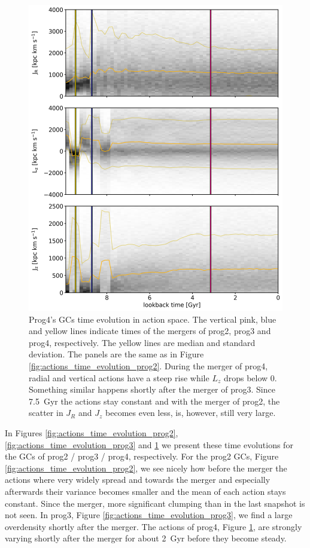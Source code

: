 \begin{figure}[htbp]
\captionsetup{format=plain}
    \centering
	\includegraphics[width=\textwidth]{plots/Dynamics/prog4/action_time_evolution_wodisk_hist_mean.png}
    \caption{Prog4's \acp{GC} time evolution in action space. The vertical pink, blue and yellow lines indicate times of the mergers of prog2, prog3 and prog4, respectively. The yellow lines are median and standard deviation. The panels are the same as in Figure \ref{fig:actions_time_evolution_prog2}. During the merger of prog4, radial and vertical actions have a steep rise while $L_z$ drops below 0. Something similar happens shortly after the merger of prog3. Since \SI{7.5}{Gyr} the actions stay constant and with the merger of prog2, the scatter in $J_R$ and $J_z$ becomes even less, is, however, still very large.}\label{fig:actions_time_evolution_prog4}
\end{figure}
In Figures \ref{fig:actions_time_evolution_prog2}, \ref{fig:actions_time_evolution_prog3} and \ref{fig:actions_time_evolution_prog4} we present these time evolutions for the \acp{GC} of prog2 / prog3 / prog4, respectively. For the prog2 \acp{GC}, Figure \ref{fig:actions_time_evolution_prog2}, we see nicely how before the merger the actions where very widely spread and towards the merger and especially afterwards their variance becomes smaller and the mean of each action stays constant. Since the merger, more significant clumping than in the last snapshot is not seen. In prog3, Figure \ref{fig:actions_time_evolution_prog3}, we find a large overdensity shortly after the merger. The actions of prog4, Figure \ref{fig:actions_time_evolution_prog4}, are strongly varying shortly after the merger for about \SI{2}{Gyr} before they become steady.


